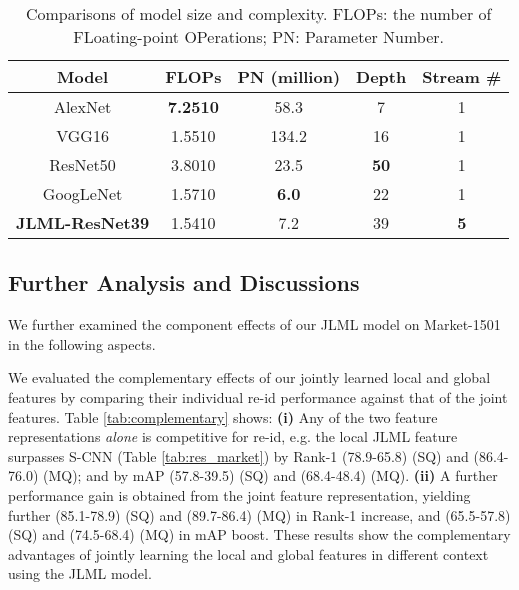 \documentclass{article}
\begin{document}
\begin{table} [!h]
	\centering
\footnotesize
\renewcommand{\arraystretch}{1}
	\setlength{\tabcolsep}{0.12 cm}
	\vspace{-0.3cm}
	\caption{ \footnotesize
		Comparisons of model size and complexity.
		FLOPs: the number of FLoating-point OPerations;
		PN: Parameter Number.
	}
	\vskip 0pt \begin{tabular}{|c||c|c|c|c|}
		\hline
Model & FLOPs & PN (million) & Depth & Stream \#
		\\ \hline
		AlexNet &  \bf 7.2510 & 58.3 & 7 & 1 \\ VGG16 & 1.5510 & 134.2 & 16 & 1 \\ ResNet50 & 3.8010 & 23.5 & \bf 50 & 1 \\ GoogLeNet & 1.5710 & \bf 6.0 & 22 & 1 \\ \hline {\bf JLML-ResNet39} & 1.5410 & 7.2 & 39 & \bf 5 \\ \hline
	\end{tabular}\label{tab:base_nets}
	\vspace{-0.3cm}
\end{table}




\subsection{Further Analysis and Discussions}
\label{sec:ablation}
We further examined the component effects of our JLML model
on Market-1501 in the following aspects.

\vspace{0.1cm}
We evaluated the complementary effects of our jointly learned local and global features
by comparing their individual re-id performance against that of the joint features.
Table \ref{tab:complementary} shows: 
{\bf (i)} Any of the two feature representations {\em alone} is
competitive for re-id, e.g. the local JLML feature surpasses S-CNN (Table \ref{tab:res_market}) 
by Rank-1 (78.9-65.8) (SQ) and (86.4-76.0) (MQ);
and by mAP (57.8-39.5) (SQ) and (68.4-48.4) (MQ). 
{\bf (ii)} A further performance gain is obtained from the joint
feature representation, yielding further (85.1-78.9) (SQ) and
(89.7-86.4) (MQ) in Rank-1 increase, and (65.5-57.8)
(SQ) and (74.5-68.4) (MQ) in mAP boost.
These results show the complementary advantages of jointly learning
the local and global features in different context using the JLML
model. 
\end{document}
